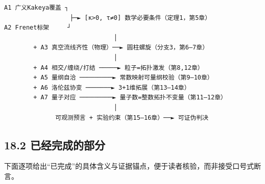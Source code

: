 \begin{verbatim}
A1 广义Kakeya覆盖 ┐
                  ├─► [κ>0, τ≠0] 数学必要条件（定理1，第5章）
A2 Frenet标架     ┘
                              │
        + A3 真空流线齐性（物理）──► 圆柱螺旋（分支3，第6–7章）
                              │
        + A4 相交/缠绕/打结 ─────► 粒子=拓扑激发（第8,12章）
        + A5 量纲自洽 ─────────► 常数映射可量纲校验（第9–10章）
        + A6 洛伦兹协变 ───────► 3+1维拓展（第13–14章）
        + A7 量子对应 ─────────► 量子数=整数拓扑不变量（第11–12章）
                              │
              可观测预言 + 实验约束（第15–16章）──► 可证伪判决
\end{verbatim}

\subsection{18.2
已经完成的部分}\label{ux5df2ux7ecfux5b8cux6210ux7684ux90e8ux5206}

下面逐项给出``已完成''的具体含义与证据锚点，便于读者核验，而非接受口号式断言。

